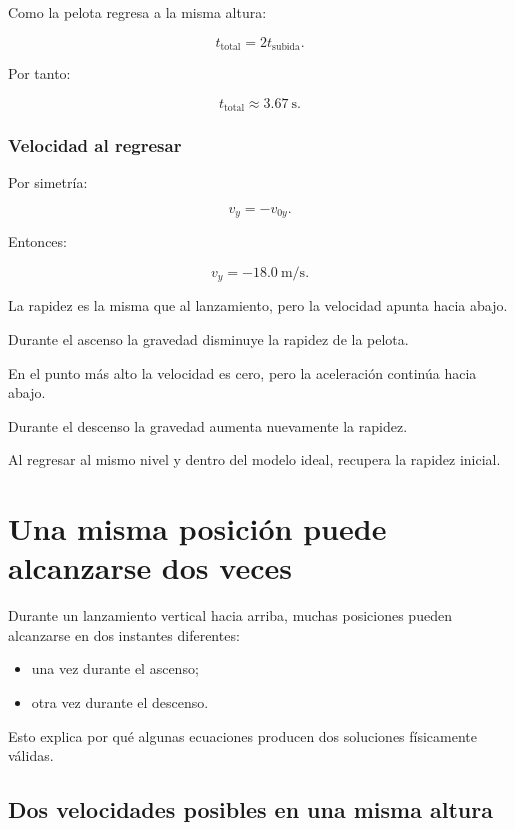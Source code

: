 Como la pelota regresa a la misma altura:

\[ t_{\text{total}}=2t_{\text{subida}}. \]

Por tanto:

\[ \boxed{t_{\text{total}}\approx\SI{3.67}{\second}}. \]


\subsubsection*{Velocidad al regresar}

Por simetría:

\[ v_y=-v_{0y}. \]

Entonces:

\[ \boxed{v_y=-\SI{18.0}{\meter\per\second}}. \]

La rapidez es la misma que al lanzamiento, pero la velocidad apunta hacia abajo.

\begin{interpretacion}
Durante el ascenso la gravedad disminuye la rapidez de la pelota.

En el punto más alto la velocidad es cero, pero la aceleración continúa hacia abajo.

Durante el descenso la gravedad aumenta nuevamente la rapidez.

Al regresar al mismo nivel y dentro del modelo ideal, recupera la rapidez inicial.
\end{interpretacion}


\section{Una misma posición puede alcanzarse dos veces}

Durante un lanzamiento vertical hacia arriba, muchas posiciones pueden alcanzarse en dos instantes diferentes:

\begin{itemize}
    \item una vez durante el ascenso;
    \item otra vez durante el descenso.
\end{itemize}

Esto explica por qué algunas ecuaciones producen dos soluciones físicamente válidas.


\subsection{Dos velocidades posibles en una misma altura}

